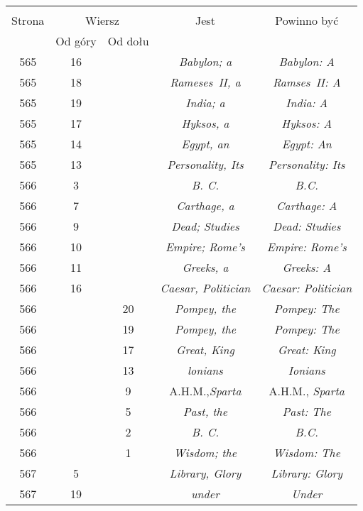 \documentclass[a4paper,11pt]{article}
\begin{document}
\begin{center}
  \begin{tabular}{|c|c|c|c|c|}
    \hline
    & \multicolumn{2}{c|}{} & & \\
    Strona & \multicolumn{2}{c|}{Wiersz} & Jest
                              & Powinno być \\ \cline{2-3}
    & Od góry & Od dołu & & \\
    \hline
    565 & 16 & & \textit{Babylon; a} & \textit{Babylon: A} \\
    565 & 18 & & \textit{Rameses~II, a} & \textit{Ramses~II: A} \\
    565 & 19 & & \textit{India; a} & \textit{India: A} \\
    565 & 17 & & \textit{Hyksos, a} & \textit{Hyksos: A} \\
    565 & 14 & & \textit{Egypt, an} & \textit{Egypt: An} \\
    565 & 13 & & \textit{Personality, Its} & \textit{Personality: Its} \\
    566 &  3 & & \textit{B. C.} & \textit{B.C.} \\
    566 &  7 & & \textit{Carthage, a} & \textit{Carthage: A} \\
    566 &  9 & & \textit{Dead; Studies} & \textit{Dead: Studies} \\
    566 & 10 & & \textit{Empire; Rome's} & \textit{Empire: Rome's} \\
    566 & 11 & & \textit{Greeks, a} & \textit{Greeks: A} \\
    566 & 16 & & \textit{Caesar, Politician}
           & \textit{Caesar: Politician} \\
    566 & & 20 & \textit{Pompey, the} & \textit{Pompey: The} \\
    566 & & 19 & \textit{Pompey, the} & \textit{Pompey: The} \\
    566 & & 17 & \textit{Great, King} & \textit{Great: King} \\
    566 & & 13 & \textit{lonians} & \textit{Ionians} \\
    566 & &  9 & A.H.M.,\textit{Sparta} & A.H.M., \textit{Sparta} \\
    566 & &  5 & \textit{Past, the} & \textit{Past: The} \\
    566 & &  2 & \textit{B. C.} & \textit{B.C.} \\
    566 & &  1 & \textit{Wisdom; the} & \textit{Wisdom: The} \\
    567 &  5 & & \textit{Library, Glory} & \textit{Library: Glory} \\
    567 & 19 & & \textit{under} & \textit{Under} \\

\end{tabular}
\end{center}
\end{document}
